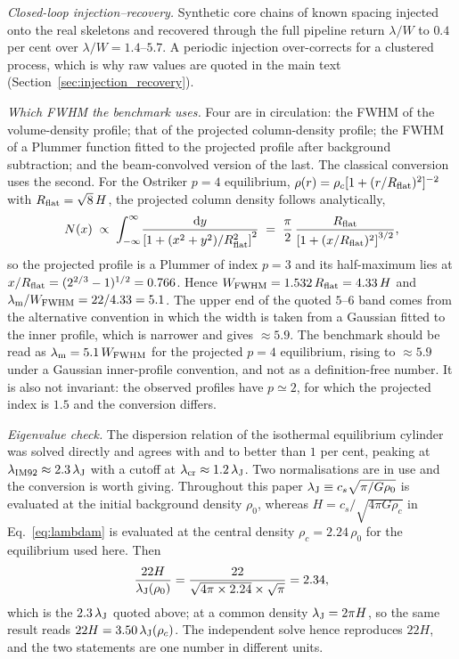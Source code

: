 \documentclass[usenatbib,twoside,twocolumn]{mnras}
\begin{document}
\emph{Closed-loop injection--recovery.} Synthetic core chains of known spacing injected onto the real skeletons and recovered through the full pipeline return $\lambda/W$ to $0.4$ per cent over $\lambda/W=1.4$--$5.7$. A periodic injection over-corrects for a clustered process, which is why raw values are quoted in the main text (Section~\ref{sec:injection_recovery}).

\emph{Which FWHM the benchmark uses.} Four are in circulation: the FWHM of the volume-density profile; that of the projected column-density profile; the FWHM of a Plummer function fitted to the projected profile after background subtraction; and the beam-convolved version of the last. The classical conversion uses the second. For the Ostriker $p=4$ equilibrium, $\rho(r)=\rho_c[1+(r/R_{\rm flat})^2]^{-2}$ with $R_{\rm flat}=\sqrt8\,H$, the projected column density follows analytically,
\begin{equation}
N(x)\;\propto\;\int_{-\infty}^{\infty}\!\frac{{\rm d}y}{\left[1+(x^2+y^2)/R_{\rm flat}^2\right]^{2}}\;=\;\frac{\pi}{2}\,\frac{R_{\rm flat}}{\left[1+(x/R_{\rm flat})^{2}\right]^{3/2}},
\label{eq:ostrikercol}
\end{equation}
so the projected profile is a Plummer of index $p=3$ and its half-maximum lies at $x/R_{\rm flat}=(2^{2/3}-1)^{1/2}=0.766$. Hence $W_{\rm FWHM}=1.532\,R_{\rm flat}=4.33\,H$ and $\lambda_{\rm m}/W_{\rm FWHM}=22/4.33=5.1$. The upper end of the quoted $5$--$6$ band comes from the alternative convention in which the width is taken from a Gaussian fitted to the inner profile, which is narrower and gives $\approx5.9$. The benchmark should be read as $\lambda_{\rm m}=5.1\,W_{\rm FWHM}$ for the projected $p=4$ equilibrium, rising to $\approx5.9$ under a Gaussian inner-profile convention, and not as a definition-free number. It is also not invariant: the observed profiles have $p\simeq2$, for which the projected index is $1.5$ and the conversion differs.

\emph{Eigenvalue check.} The dispersion relation of the isothermal equilibrium cylinder was solved directly and agrees with \citet{Nagasawa1987} and \citet{Fischera2012} to better than $1$ per cent, peaking at $\lambda_{\rm IM92}\approx2.3\,\lambda_{\rm J}$ with a cutoff at $\lambda_{\rm cr}\approx1.2\,\lambda_{\rm J}$. Two normalisations are in use and the conversion is worth giving. Throughout this paper $\lambda_{\rm J}\equiv c_s\sqrt{\pi/G\rho_0}$ is evaluated at the initial background density $\rho_0$, whereas $H=c_s/\sqrt{4\pi G\rho_c}$ in Eq.~\ref{eq:lambdam} is evaluated at the central density $\rho_c=2.24\,\rho_0$ for the equilibrium used here. Then
\begin{equation}
\frac{22H}{\lambda_{\rm J}(\rho_0)}=\frac{22}{\sqrt{4\pi\times2.24}\times\sqrt{\pi}}=2.34,
\label{eq:hconv}
\end{equation}
which is the $2.3\,\lambda_{\rm J}$ quoted above; at a common density $\lambda_{\rm J}=2\pi H$, so the same result reads $22H=3.50\,\lambda_{\rm J}(\rho_c)$. The independent solve hence reproduces $22H$, and the two statements are one number in different units.
\end{document}
